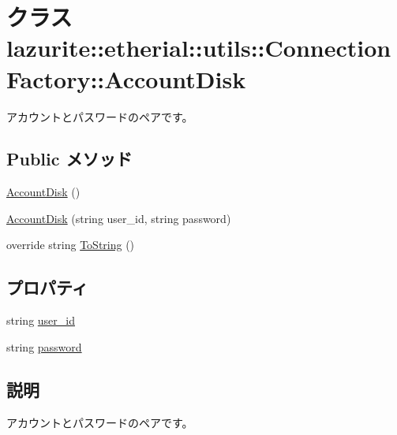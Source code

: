 \hypertarget{classlazurite_1_1etherial_1_1utils_1_1_connection_factory_1_1_account_disk}{
\section{クラス lazurite::etherial::utils::ConnectionFactory::AccountDisk}
\label{classlazurite_1_1etherial_1_1utils_1_1_connection_factory_1_1_account_disk}
}


アカウントとパスワードのペアです。  
\subsection*{Public メソッド}
\begin{DoxyCompactItemize}
\item 
\hyperlink{classlazurite_1_1etherial_1_1utils_1_1_connection_factory_1_1_account_disk_a4abd4052c0489a6d9547ccdba3710cd0}{AccountDisk} ()
\item 
\hyperlink{classlazurite_1_1etherial_1_1utils_1_1_connection_factory_1_1_account_disk_a06d8be05653afe18c1d6860c7c2cb99a}{AccountDisk} (string user\_\-id, string password)
\item 
override string \hyperlink{classlazurite_1_1etherial_1_1utils_1_1_connection_factory_1_1_account_disk_a7943deff79dfd41d82ad0e2a349650f8}{ToString} ()
\end{DoxyCompactItemize}
\subsection*{プロパティ}
\begin{DoxyCompactItemize}
\item 
string \hyperlink{classlazurite_1_1etherial_1_1utils_1_1_connection_factory_1_1_account_disk_a987ae512da2808d3692666629e33a5ad}{user\_\-id}
\item 
string \hyperlink{classlazurite_1_1etherial_1_1utils_1_1_connection_factory_1_1_account_disk_aa56d49c31498cf0a8daa3eecbc53318a}{password}
\end{DoxyCompactItemize}


\subsection{説明}
アカウントとパスワードのペアです。 

